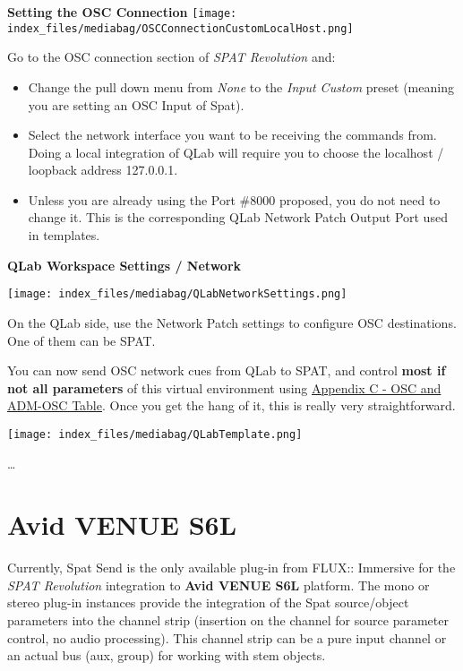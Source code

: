 \documentclass[
  letterpaper,
  DIV=11,
  numbers=noendperiod]{scrreport}
\begin{document}
\textbf{Setting the OSC Connection}
\texttt{[image: index\_files/mediabag/OSCConnectionCustomLocalHost.png]}

Go to the OSC connection section of \emph{SPAT Revolution} and:

\begin{itemize}
\item
  Change the pull down menu from \emph{None} to the \emph{Input
  \textbar{} Custom} preset (meaning you are setting an OSC Input of
  Spat).
\item
  Select the network interface you want to be receiving the commands
  from. Doing a local integration of QLab will require you to choose the
  localhost / loopback address 127.0.0.1.
\item
  Unless you are already using the Port \#8000 proposed, you do not need
  to change it. This is the corresponding QLab Network Patch Output Port
  used in templates.
\end{itemize}

\textbf{QLab Workspace Settings / Network}

\texttt{[image: index\_files/mediabag/QLabNetworkSettings.png]}

On the QLab side, use the Network Patch settings to configure OSC
destinations. One of them can be SPAT.

You can now send OSC network cues from QLab to SPAT, and control
\textbf{most if not all parameters} of this virtual environment using
\href{Appendix_C_OSC_Table.md}{Appendix C - OSC and ADM-OSC Table}. Once
you get the hang of it, this is really very straightforward.

\texttt{[image: index\_files/mediabag/QLabTemplate.png]}

\ldots{}

\hypertarget{avid-venue-s6l}{%
\chapter{Avid VENUE S6L}\label{avid-venue-s6l}}

Currently, Spat Send is the only available plug-in from FLUX:: Immersive
for the \emph{SPAT Revolution} integration to \textbf{Avid VENUE S6L}
platform. The mono or stereo plug-in instances provide the integration
of the Spat source/object parameters into the channel strip (insertion
on the channel for source parameter control, no audio processing). This
channel strip can be a pure input channel or an actual bus (aux, group)
for working with stem objects.
\end{document}

